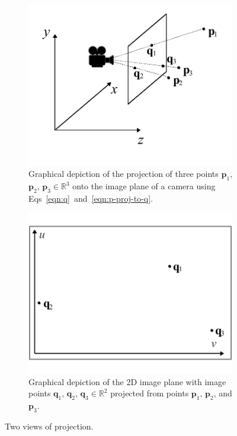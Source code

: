\documentclass[10pt]{article}
\begin{document}
\begin{figure}
\centering
\begin{subfigure}{.4\textwidth}
  \centering
  \includegraphics[width=1\linewidth]{figures/camera-projection-3d}
  \caption{Graphical depiction of the projection of three points $\mathbf{p}_1$, $\mathbf{p}_2$, $\mathbf{p}_3 \in \mathbb{R}^3$ onto the image plane of a camera using Eqs~\ref{eqn:q}~and~\ref{eqn:p-proj-to-q}.}
  \label{fig:3d}
\end{subfigure}%
\hspace{1cm}
\begin{subfigure}{.4\textwidth}
  \centering
  \includegraphics[width=1\linewidth]{figures/camera-projection-2d}
  \caption{Graphical depiction of the 2D image plane with image points $\mathbf{q}_1$, $\mathbf{q}_2$, $\mathbf{q}_3 \in \mathbb{R}^2$ projected from points $\mathbf{p}_1$, $\mathbf{p}_2$, and $\mathbf{p}_3$.}
  \label{fig:2d}
\end{subfigure}
\caption{Two views of projection.\label{fig:projections}}
\end{figure}
\end{document}
